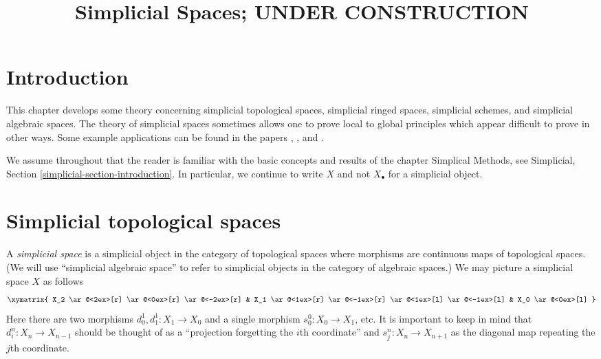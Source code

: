 

%


\title{Simplicial Spaces; UNDER CONSTRUCTION}


\maketitle

\label{section-phantom}

\tableofcontents

\section{Introduction}
\label{section-introduction}

\noindent
This chapter develops some theory concerning simplicial topological spaces,
simplicial ringed spaces, simplicial schemes, and simplicial algebraic spaces.
The theory of simplicial spaces sometimes allows one to prove local to global
principles which appear difficult to prove in other ways.
Some example applications can be found in the papers
\cite{faltings_finiteness}, \cite{Kiehl}, and \cite{HodgeIII}.

\medskip\noindent
We assume throughout that the reader is familiar with the basic concepts
and results of the chapter Simplical Methods, see
Simplicial, Section \ref{simplicial-section-introduction}.
In particular, we continue to write $X$ and not $X_\bullet$
for a simplicial object.








\section{Simplicial topological spaces}
\label{section-simplicial-top}

\noindent
A {\it simplicial space} is a simplicial object in the category of
topological spaces where morphisms are continuous maps of topological
spaces. (We will use ``simplicial algebraic space'' to refer to simplicial
objects in the category of algebraic spaces.)
We may picture a simplicial space $X$ as follows
$$
\xymatrix{
X_2
\ar@<2ex>[r]
\ar@<0ex>[r]
\ar@<-2ex>[r]
&
X_1
\ar@<1ex>[r]
\ar@<-1ex>[r]
\ar@<1ex>[l]
\ar@<-1ex>[l]
&
X_0
\ar@<0ex>[l]
}
$$
Here there are two morphisms $d^1_0, d^1_1 : X_1 \to X_0$
and a single morphism $s^0_0 : X_0 \to X_1$, etc.
It is important to keep in mind that $d^n_i : X_n \to X_{n - 1}$
should be thought of as a ``projection forgetting the
$i$th coordinate'' and $s^n_j : X_n \to X_{n + 1}$ as the diagonal
map repeating the $j$th coordinate.

